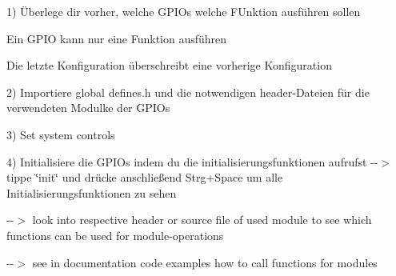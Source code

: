 1) Überlege dir vorher, welche G\+P\+I\+Os welche F\+Unktion ausführen sollen


\begin{DoxyItemize}
\item Ein G\+P\+IO kann nur eine Funktion ausführen
\item Die letzte Konfiguration überschreibt eine vorherige Konfiguration
\end{DoxyItemize}

2) Importiere global defines.\+h und die notwendigen header-\/\+Dateien für die verwendeten Modulke der G\+P\+I\+Os

3) Set system controls

4) Initialisiere die G\+P\+I\+Os indem du die initialisierungsfunktionen aufrufst -\/-\/$>$ tippe \char`\"{}init\char`\"{} und drücke anschließend Strg+\+Space um alle Initialisierungsfunktionen zu sehen

-\/-\/$>$ look into respective header or source file of used module to see which functions can be used for module-\/operations

-\/-\/$>$ see in documentation code examples how to call functions for modules 